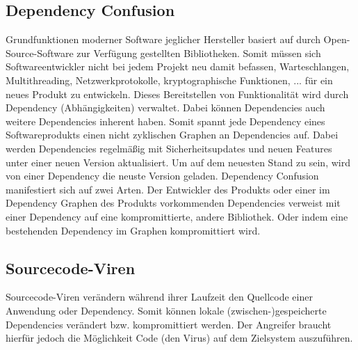         \subsection{Dependency Confusion} \label{Dependency Confusion}
            Grundfunktionen moderner Software jeglicher Hersteller basiert auf durch Open-Source-Software zur Verfügung gestellten Bibliotheken. Somit müssen sich Softwareentwickler nicht bei jedem Projekt neu damit befassen, Warteschlangen, Multithreading, Netzwerkprotokolle, kryptographische Funktionen, ... für ein neues Produkt zu entwickeln. Dieses Bereitstellen von Funktionalität wird durch Dependency (Abhängigkeiten) verwaltet. Dabei können Dependencies auch weitere Dependencies inherent haben. Somit spannt jede Dependency eines Softwareprodukts einen nicht zyklischen Graphen an Dependencies auf. Dabei werden Dependencies regelmäßig mit Sicherheitsupdates und neuen Features unter einer neuen Version aktualisiert. 
            Um auf dem neuesten Stand zu sein, wird von einer Dependency die neuste Version geladen.
            Dependency Confusion manifestiert sich auf zwei Arten. Der Entwickler des Produkts oder einer im Dependency Graphen des Produkts vorkommenden Dependencies verweist mit einer Dependency auf eine kompromittierte, andere Bibliothek. 
            Oder indem eine bestehenden Dependency im Graphen kompromittiert wird.

        \subsection{Sourcecode-Viren} \label{Sourcecode-Viren}
            Sourcecode-Viren verändern während ihrer Laufzeit den Quellcode einer Anwendung oder Dependency. Somit können lokale (zwischen-)gespeicherte Dependencies verändert bzw. kompromittiert werden. Der Angreifer braucht hierfür jedoch die Möglichkeit Code (den Virus) auf dem Zielsystem auszuführen. 


